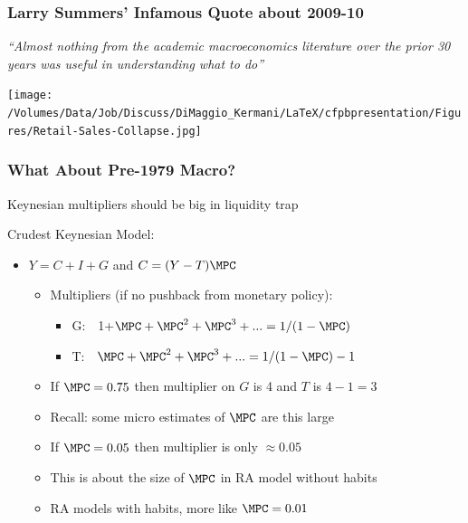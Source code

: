 \documentclass{beamer}
\newcommand{\jemph}[1]{{\color{jirkasred}#1}}
\begin{document}
\begin{frame}\frametitle{Larry Summers' Infamous Quote about 2009-10}

{\it ``Almost nothing from the academic macroeconomics literature over the prior
30 years was useful in understanding what to do''} 

\begin{center}
\texttt{[image: /Volumes/Data/Job/Discuss/DiMaggio\_Kermani/LaTeX/cfpbpresentation/Figures/Retail-Sales-Collapse.jpg]}
\end{center}

\end{frame}

\begin{frame}\frametitle{What About Pre-1979 Macro?}

Keynesian \jemph{multipliers} should be big in liquidity trap \pause 

\medskip\medskip
Crudest Keynesian Model:
\begin{itemize}
\item $Y = C + I + G $ and $C = (Y-T) \MPC $
\begin{itemize}
\item Multipliers (if no pushback from monetary policy):
\begin{itemize}
\item G:~~1+$\MPC + \MPC^2 + \MPC^3 + ... = 1/(1-\MPC)$
\item T:~~\phantom{1+}$\MPC + \MPC^2 + \MPC^3 + ... =1/(1-\MPC)-1$
\end{itemize}
\end{itemize}

\begin{itemize}
\item If $\MPC = 0.75$ then multiplier on $G$ is 4 and $T$ is $4-1=3$
\bi
\item Recall: some micro estimates of $\MPC$ are this large
\ei
\item If $\MPC = 0.05$ then multiplier is only $\approx 0.05$
\bi
\item This is about the size of $\MPC$ in RA model without habits
\item RA models with habits, more like $\MPC=0.01$
\ei
\end{itemize}
\end{itemize}

\end{frame}
\end{document}
